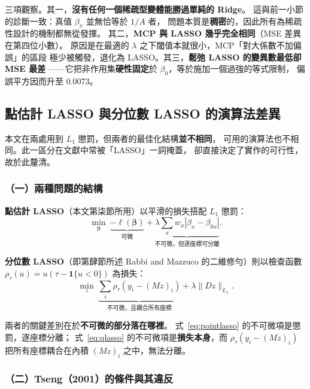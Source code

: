 \documentclass[UTF8, fontset=macnew, a4paper, 12pt]{ctexart}
\begin{document}
三項觀察。其一，\textbf{沒有任何一個稀疏型變體能勝過單純的 Ridge}。
這與前一小節的診斷一致：真值 $\beta_x$ 並無恰等於 $1/A$ 者，
問題本質是\textbf{稠密}的，因此所有為稀疏性設計的機制都無從發揮。
其二，\textbf{MCP 與 LASSO 幾乎完全相同}（MSE 差異在第四位小數）。
原因是在最適的 $\lambda$ 之下閾值本就很小，MCP「對大係數不加偏誤」的區段
極少被觸發，退化為 LASSO。其三，\textbf{鬆弛 LASSO 的變異數最低卻 MSE 最差}
——它把非作用集\textbf{硬性固定}於 $\beta_0$，等於施加一個過強的等式限制，
偏誤平方因而升至 0.0073。

\subsection{點估計 LASSO 與分位數 LASSO 的演算法差異}\label{sec:algodiff}

本文在兩處用到 $L_1$ 懲罰，但兩者的最佳化結構\textbf{並不相同}，
可用的演算法也不相同。此一區分在文獻中常被「LASSO」一詞掩蓋，
卻直接決定了實作的可行性，故於此釐清。

\subsubsection{（一）兩種問題的結構}

\textbf{點估計 LASSO}（本文第柒節所用）以平滑的損失搭配 $L_1$ 懲罰：
\begin{equation}\label{eq:pointlasso}
\min_{\boldsymbol{\beta}}\ \underbrace{-\ell(\boldsymbol{\beta})}_{\text{可微}}
+\underbrace{\lambda\textstyle\sum_x w_x|\beta_x-\beta_{0x}|}_{\text{不可微，但逐座標可分離}} .
\end{equation}

\textbf{分位數 LASSO}（即第肆節所述 Rabbi and Mazzuco 的二維修勻）則以檢查函數
$\rho_\tau(u)=u(\tau-\mathbf{1}\{u<0\})$ 為損失：
\begin{equation}\label{eq:qlasso}
\min_{z}\ \underbrace{\textstyle\sum_i\rho_\tau(y_i-(Mz)_i)}_{\text{不可微，且耦合所有座標}}
+\lambda\|Dz\|_{L_1}.
\end{equation}

兩者的關鍵差別在於\textbf{不可微的部分落在哪裡}。
式~\eqref{eq:pointlasso} 的不可微項是懲罰，逐座標分離；
式~\eqref{eq:qlasso} 的不可微項是\textbf{損失本身}，而
$\rho_\tau(y_i-(Mz)_i)$ 把所有座標耦合在內積 $(Mz)_i$ 之中，無法分離。

\subsubsection{（二）Tseng（2001）的條件與其違反}
\end{document}
